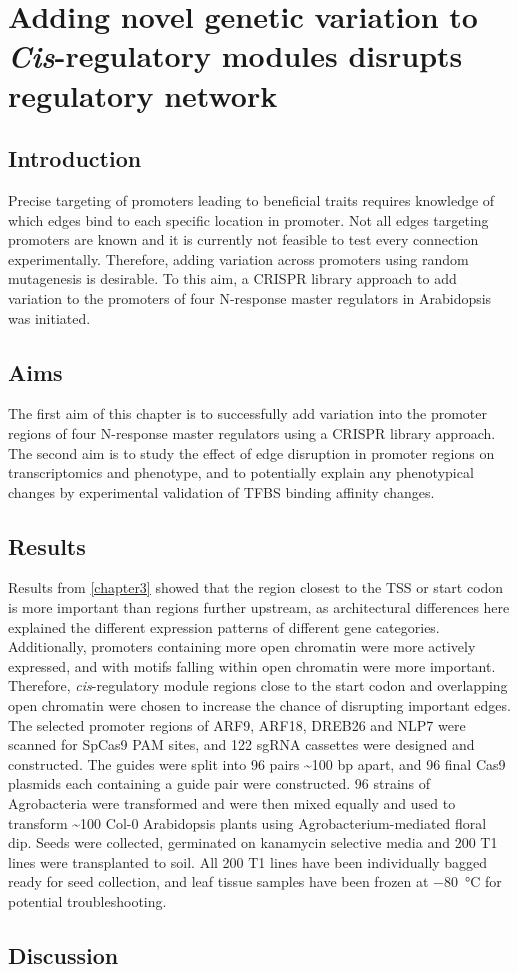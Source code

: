 \documentclass[../main.tex]{subfiles}
\begin{document}
\chapter{Adding novel genetic variation to \textit{Cis}\hyp{}regulatory modules disrupts regulatory network}\label{chapter7}
\section{Introduction}\label{chapter7:introduction}

Precise targeting of promoters leading to beneficial traits requires knowledge of which edges bind to each specific location in promoter.
Not all edges targeting promoters are known and it is currently not feasible to test every connection experimentally.
Therefore, adding variation across promoters using random mutagenesis is desirable.
To this aim, a CRISPR library approach to add variation to the promoters of four N-response master regulators in Arabidopsis was initiated.
\section{Aims}\label{chapter7:aims}
The first aim of this chapter is to successfully add variation into the promoter regions of four N\hyp{}response master regulators using a CRISPR library approach.
The second aim is to study the effect of edge disruption in promoter regions on transcriptomics and phenotype, and to potentially explain any phenotypical changes by experimental validation of TFBS binding affinity changes.

\section{Results}\label{chapter7:results}
Results from \autoref{chapter3} showed that the region closest to the TSS or start codon is more important than regions further upstream, as architectural differences here explained the different expression patterns of different gene categories.
Additionally, promoters containing more open chromatin were more actively expressed, and with motifs falling within open chromatin were more important.
Therefore, \textit{cis}\hyp{}regulatory module regions close to the start codon and overlapping open chromatin were chosen to increase the chance of disrupting important edges.
The selected promoter regions of ARF9, ARF18, DREB26 and NLP7 were scanned for SpCas9 PAM sites, and 122 sgRNA cassettes were designed and constructed.
The guides were split into 96 pairs \textasciitilde{}100 bp apart, and 96 final Cas9 plasmids each containing a guide pair were constructed.
96 strains of Agrobacteria were transformed and were then mixed equally and used to transform \textasciitilde{}100 Col-0 Arabidopsis plants using Agrobacterium\hyp{}mediated floral dip.
Seeds were collected, germinated on kanamycin selective media and 200 T1 lines were transplanted to soil.
All 200 T1 lines have been individually bagged ready for seed collection, and leaf tissue samples have been frozen at \SI{-80}{\degreeCelsius} for potential troubleshooting.

\section{Discussion}\label{chapter7:discussion}
\end{document}
